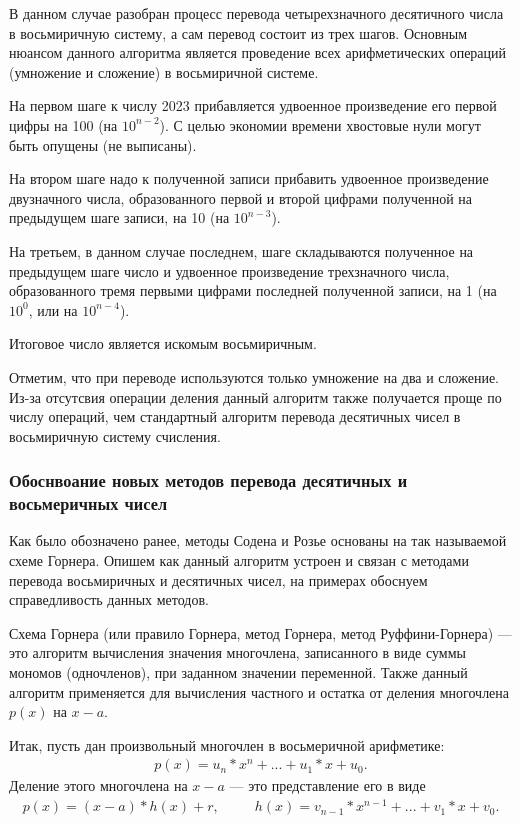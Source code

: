 \documentclass[14pt, russian]{scrartcl}
\begin{document}
В данном случае разобран процесс перевода четырехзначного десятичного числа в восьмиричную систему, а сам перевод состоит из трех шагов. Основным нюансом данного алгоритма является проведение всех арифметических операций (умножение и сложение) в восьмиричной системе.

На первом шаге к числу 2023 прибавляется удвоенное произведение его первой цифры на 100 (на $10^{n-2}$). С целью экономии времени хвостовые нули могут быть опущены (не выписаны).

На втором шаге надо к полученной записи прибавить удвоенное произведение двузначного числа, образованного первой и второй цифрами полученной на предыдущем шаге записи, на 10 (на $10^{n-3}$).

На третьем, в данном случае последнем, шаге складываются полученное на предыдущем шаге число и удвоенное произведение трехзначного числа, образованного тремя первыми цифрами последней полученной записи, на 1 (на $10^0$, или на $10^{n-4}$).

Итоговое число является искомым восьмиричным.

Отметим, что при переводе используются только умножение на два и сложение. Из-за отсутсвия операции деления данный алгоритм также получается проще по числу операций, чем стандартный алгоритм перевода десятичных чисел в восьмиричную систему счисления.

\subsubsection{Обоснвоание новых методов перевода десятичных и восьмеричных чисел}

Как было обозначено ранее, методы Содена и Розье основаны на так называемой схеме Горнера. Опишем как данный алгоритм устроен и связан с методами перевода восьмиричных и десятичных чисел, на примерах обоснуем справедливость данных методов. 

Схема Горнера (или правило Горнера, метод Горнера, метод Руффини-Горнера) — это алгоритм вычисления значения многочлена, записанного в виде суммы мономов (одночленов), при заданном значении переменной. Также данный алгоритм применяется для вычисления частного и остатка от деления многочлена $p(x)$ на $x - a$.

Итак, пусть дан произвольный многочлен
в восьмеричной арифметике:
\label{Example:MathFont8} 
\begin{equation*}\label{eq:8}
\begin{aligned}
p(x) = u_n * x^n + ... + u_1 * x + u_0.
\end{aligned}
\end{equation*}
\noindent
Деление этого многочлена на $x - a$ — это представление его в виде 
\label{Example:MathFont9} 
\begin{equation*}\label{eq:9}
\begin{aligned}
p(x) = (x - a) * h(x) + r,\,\,\,\qquad
h(x) = v_{n-1} * x^{n-1} + ... + v_1 * x + v_0.
\end{aligned}
\end{equation*}
\end{document}
